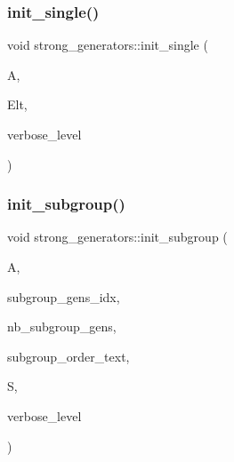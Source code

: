 \mbox{\label{classstrong__generators_a771c304a77ca04b9b784c8abc41a0c84}} 
\subsubsection{\texorpdfstring{init\+\_\+single()}{init\_single()}}
{\footnotesize\ttfamily void strong\+\_\+generators\+::init\+\_\+single (\begin{DoxyParamCaption}\item[{\mbox{\hyperlink{classaction}{action}} $\ast$}]{A,  }\item[{\mbox{\hyperlink{galois_8h_a09fddde158a3a20bd2dcadb609de11dc}{I\+NT}} $\ast$}]{Elt,  }\item[{\mbox{\hyperlink{galois_8h_a09fddde158a3a20bd2dcadb609de11dc}{I\+NT}}}]{verbose\+\_\+level }\end{DoxyParamCaption})}

\mbox{\label{classstrong__generators_ae6e516c1240181e1ea5e1968c2073b0f}} 
\subsubsection{\texorpdfstring{init\+\_\+subgroup()}{init\_subgroup()}}
{\footnotesize\ttfamily void strong\+\_\+generators\+::init\+\_\+subgroup (\begin{DoxyParamCaption}\item[{\mbox{\hyperlink{classaction}{action}} $\ast$}]{A,  }\item[{\mbox{\hyperlink{galois_8h_a09fddde158a3a20bd2dcadb609de11dc}{I\+NT}} $\ast$}]{subgroup\+\_\+gens\+\_\+idx,  }\item[{\mbox{\hyperlink{galois_8h_a09fddde158a3a20bd2dcadb609de11dc}{I\+NT}}}]{nb\+\_\+subgroup\+\_\+gens,  }\item[{const \mbox{\hyperlink{galois_8h_ab6cc7b4aeb6ea31aba2b3fbfc83ff5e6}{B\+Y\+TE}} $\ast$}]{subgroup\+\_\+order\+\_\+text,  }\item[{\mbox{\hyperlink{classsims}{sims}} $\ast$}]{S,  }\item[{\mbox{\hyperlink{galois_8h_a09fddde158a3a20bd2dcadb609de11dc}{I\+NT}}}]{verbose\+\_\+level }\end{DoxyParamCaption})}

